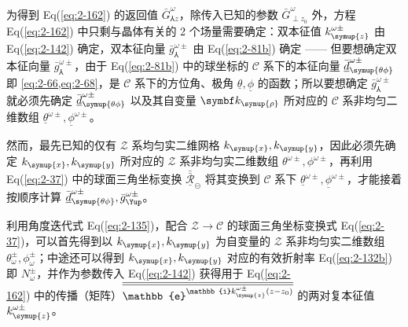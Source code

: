 为得到 Eq(\ref{eq:2-162}) 的返回值 $\bar{G}^{\omega}_{\Yup z}$，除传入已知的参数 $\bar{G}^{\omega}_{\perp z_0}$ 外，方程 Eq(\ref{eq:2-162}) 中只剩与晶体有关的 2 个场量需要确定：双本征值 $k^{\omega\pm}_{\symup{z}}$ 由 Eq(\ref{eq:2-142}) 确定，双本征向量 $\bar{g}^{\omega\pm}_{\Yup}$ 由 Eq(\ref{eq:2-81b}) 确定 —— 但要想确定双本征向量 $\bar{g}^{\omega\pm}_{\Yup}$，由于 Eq(\ref{eq:2-81b}) 中的球坐标的 $\mathcal C$ 系下的本征向量 $\bar{\underline{d}}^{\omega\pm}_{\symup{\theta\phi}}$ 即 \cref{eq:2-66,eq:2-68}，是 $\mathcal C$ 系下的方位角、极角 $\underline{\theta}, \underline{\phi}$ 的函数；所以要想确定 $\bar{g}^{\omega\pm}_{\Yup}$ 就必须先确定 $\bar{\underline{d}}^{\omega\pm}_{\symup{\theta\phi}}$ 以及其自变量 $\symbf k_{\symup{\rho}}$ 所对应的 $\mathcal C$ 系非均匀二维数组 $\underline{\theta}^{\omega\pm}, \underline{\phi}^{\omega\pm}$。

然而，最先已知的仅有 $\mathcal Z$ 系均匀实二维网格 $k_{\symup{x}},k_{\symup{y}}$，因此必须先确定 $k_{\symup{x}},k_{\symup{y}}$ 所对应的 $\mathcal Z$ 系非均匀实二维数组 $\theta^{\omega\pm}, \phi^{\omega\pm}$，再利用 Eq(\ref{eq:2-37}) 中的球面三角坐标变换 $\bar{\bar{\underline{\mathcal{R}}}}_{\circleddash}$ 将其变换到 $\mathcal C$ 系下 $\underline{\theta}^{\omega\pm}, \underline{\phi}^{\omega\pm}$，才能接着按顺序计算 $\bar{\underline{d}}^{\omega\pm}_{\symup{\theta\phi}}, \bar{g}^{\omega\pm}_{\Yup}$。

利用角度迭代式 Eq(\ref{eq:2-135})，配合 $\mathcal Z \to \mathcal C$ 的球面三角坐标变换式 Eq(\ref{eq:2-37})，可以首先得到以 $k_{\symup{x}},k_{\symup{y}}$ 为自变量的 $\mathcal Z$ 系非均匀实二维数组 $\theta^{\pm}_\omega, \phi^{\pm}_\omega$；中途还可以得到 $k_{\symup{x}},k_{\symup{y}}$ 对应的有效折射率 Eq(\ref{eq:2-132b}) 即 $N^{\pm}_{\omega}$，并作为参数传入 Eq(\ref{eq:2-142}) 获得用于 Eq(\ref{eq:2-162}) 中的传播（矩阵）$\overline{\overline{\mathbb{e}^{ \mathbb{i} k^{\omega\pm}_{\symup{z}} \left( z - z_0 \right)}}}$ 的两对复本征值 $k^{\omega\pm}_{\symup{z}}$。

